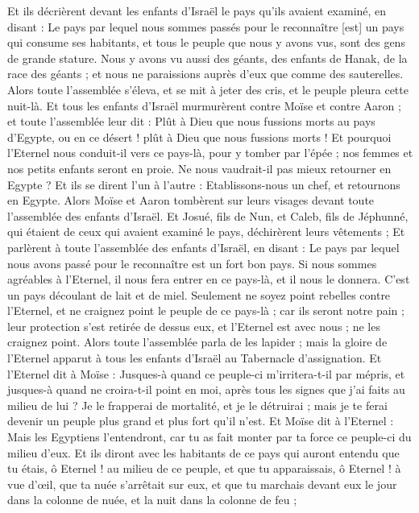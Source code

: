 \begin{multicols}{2}
Et ils décrièrent devant les enfants d'Israël le pays qu'ils avaient examiné, en disant : Le pays par lequel nous sommes passés pour le reconnaître [est] un pays qui consume ses habitants, et tous le peuple que nous y avons vus, sont des gens de grande stature.
Nous y avons vu aussi des géants, des enfants de Hanak, de la race des géants ; et nous ne paraissions auprès d'eux que comme des sauterelles.
\VerseOne{}Alors toute l'assemblée s'éleva, et se mit à jeter des cris, et le peuple pleura cette nuit-là.
Et tous les enfants d'Israël murmurèrent contre Moïse et contre Aaron ; et toute l'assemblée leur dit : Plût à Dieu que nous fussions morts au pays d'Egypte, ou en ce désert ! plût à Dieu que nous fussions morts !
Et pourquoi l'Eternel nous conduit-il vers ce pays-là, pour y tomber par l'épée ; nos femmes et nos petits enfants seront en proie. Ne nous vaudrait-il pas mieux retourner en Egypte ?
Et ils se dirent l'un à l'autre : Etablissons-nous un chef, et retournons en Egypte.
Alors Moïse et Aaron tombèrent sur leurs visages devant toute l'assemblée des enfants d'Israël.
Et Josué, fils de Nun, et Caleb, fils de Jéphunné, qui étaient de ceux qui avaient examiné le pays, déchirèrent leurs vêtements ;
Et parlèrent à toute l'assemblée des enfants d'Israël, en disant : Le pays par lequel nous avons passé pour le reconnaître est un fort bon pays.
Si nous sommes agréables à l'Eternel, il nous fera entrer en ce pays-là, et il nous le donnera. C'est un pays découlant de lait et de miel.
Seulement ne soyez point rebelles contre l'Eternel, et ne craignez point le peuple de ce pays-là ; car ils seront notre pain ; leur protection s'est retirée de dessus eux, et l'Eternel est avec nous ; ne les craignez point.
Alors toute l'assemblée parla de les lapider ; mais la gloire de l'Eternel apparut à tous les enfants d'Israël au Tabernacle d'assignation.
Et l'Eternel dit à Moïse : Jusques-à quand ce peuple-ci m'irritera-t-il par mépris, et jusques-à quand ne croira-t-il point en moi, après tous les signes que j'ai faits au milieu de lui ?
Je le frapperai de mortalité, et je le détruirai ; mais je te ferai devenir un peuple plus grand et plus fort qu'il n'est.
Et Moïse dit à l'Eternel : Mais les Egyptiens l'entendront, car tu as fait monter par ta force ce peuple-ci du milieu d'eux.
Et ils diront avec les habitants de ce pays qui auront entendu que tu étais, ô Eternel ! au milieu de ce peuple, et que tu apparaissais, ô Eternel ! à vue d'œil, que ta nuée s'arrêtait sur eux, et que tu marchais devant eux le jour dans la colonne de nuée, et la nuit dans la colonne de feu ;

\end{multicols}
